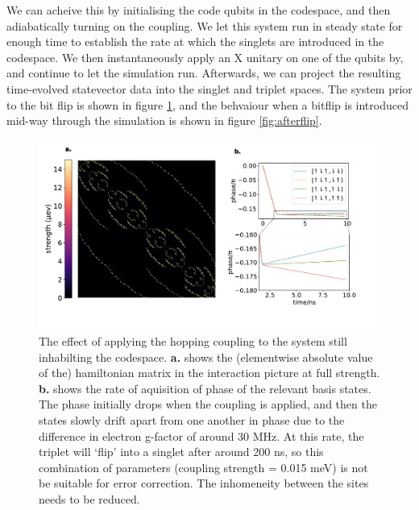 \documentclass{report}
\begin{document}
We can acheive this by initialising the code qubits in the codespace, and then adiabatically turning on the coupling. We let this system run in steady state for enough time to establish the rate at which the singlets are introduced in the codespace. We then instantaneously apply an X unitary on one of the qubits by, and continue to let the simulation run. Afterwards, we can project the resulting time-evolved statevector data into the singlet and triplet spaces. The system prior to the bit flip is shown in figure \ref{fig:beforeflip}, and the behvaiour when a bitflip is introduced mid-way through the simulation is shown in figure \ref{fig:afterflip}.
\begin{figure}[ht]
    \centering
    \includegraphics[scale = 1]{Figures/singlettriplet.pdf}
    \caption{The effect of applying the hopping coupling to the system still inhabilting the codespace. \textbf{a.} shows the (elementwise absolute value of the) hamiltonian matrix in the interaction picture at full strength. \textbf{b.} shows the rate of aquisition of phase of the relevant basis states. The phase initially drops when the coupling is applied, and then the states slowly drift apart from one another in phase due to the difference in electron g-factor of around 30 \unit{\mega\hertz}. At this rate, the triplet will `flip' into a singlet after around 200 \unit{\nano \second}, so this combination of parameters (coupling strength = 0.015 \unit{\milli\electronvolt}) is not be suitable for error correction. The inhomeneity between the sites needs to be reduced.
    }\label{fig:beforeflip}
\end{figure}
\end{document}
